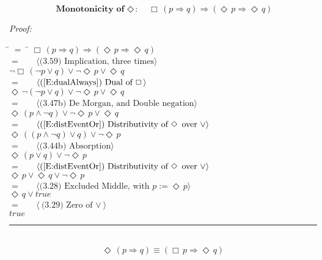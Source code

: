 \documentclass[fleqn, leqno]{article}
\newcommand{\lgap}{2pt}                             %
\newcommand{\mymathindent}{24pt}                    %
\newcommand{\Event}{\Diamond\,}
\newcommand{\Always}{\Box\,}
\newcommand{\myqed}{\hfill\rule[-.23ex]{1.2ex}{2.0ex}}
\newcommand{\Gll} {\langle}                         %
\newcommand{\Ggg} {\rangle}                         %
\newcommand{\Hint}[1]     {\ \ \ $\Gll              \mbox{#1} \Ggg$ }   %
\begin{document}
\begin{equation}\label{E:alwaysImpEvents}
\textbf{Monotonicity of $\Event$:}\quad \Always (p \Rightarrow q) \Rightarrow (\Event p \Rightarrow \Event q)
\end{equation}

\emph{Proof:}
\begin{tabbing}
\hspace{\mymathindent} \= $= \;$ \= \kill
  \> \>   $\Always (p \Rightarrow q) \Rightarrow (\Event p \Rightarrow \Event q)$\\[\lgap]
  \> $=$  \>  \Hint{(3.59) Implication, three times}\\[\lgap]
  \> \>   $\lnot\Always (\lnot p \lor q) \lor \lnot\Event p \lor \Event q$\\[\lgap]
  \> $=$  \>  \Hint{(\ref{E:dualAlways}) Dual of $\Always$}\\[\lgap]
  \> \>   $\Event\lnot (\lnot p \lor q) \lor \lnot\Event p \lor \Event q$\\[\lgap]  
  \> $=$  \>  \Hint{(3.47b) De Morgan, and Double negation}\\[\lgap]
  \> \>   $\Event(p \land \lnot q) \lor \lnot\Event p \lor \Event q$\\[\lgap]
  \> $=$  \>  \Hint{(\ref{E:distEventOr}) Distributivity of $\Event$ over $\lor$}\\[\lgap]
  \> \>   $\Event((p \land \lnot q) \lor q) \lor \lnot\Event p$\\[\lgap]
  \> $=$  \>  \Hint{(3.44b) Absorption}\\[\lgap]
  \> \>   $\Event(p \lor q) \lor \lnot\Event p$\\[\lgap]
  \> $=$  \>  \Hint{(\ref{E:distEventOr}) Distributivity of $\Event$ over $\lor$}\\[\lgap]
  \> \>   $\Event p \lor \Event q \lor \lnot\Event p$\\[\lgap]
  \> $=$  \>  \Hint{(3.28) Excluded Middle, with $p := \Event p$}\\[\lgap]
  \> \>   $\Event q \lor true$\\[\lgap]
  \> $=$  \>  \Hint{(3.29) Zero of $\lor$}\\[\lgap]
  \> \>   $true$\\[\lgap]
\end{tabbing}
\myqed\\[\lgap]


\begin{equation}\label{E:eventImpAlways}
\Event (p \Rightarrow q) \equiv (\Always p \Rightarrow \Event q)
\end{equation}
\end{document}
